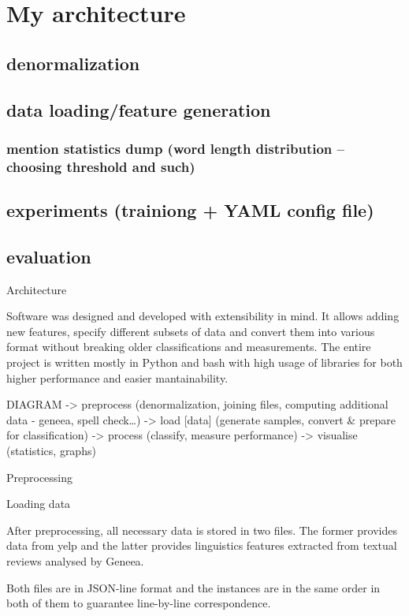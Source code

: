 \chapter{My architecture}

\section{denormalization}

\section{data loading/feature generation}

\subsection{mention statistics dump (word length distribution -- choosing threshold and such)}

\section{experiments (trainiong + YAML config file)}

\section{evaluation}

Architecture

Software was designed and developed with extensibility in mind. It allows adding new features, specify different subsets of data and convert them into various format without breaking older classifications and measurements.
The entire project is written mostly in Python and bash with high usage of libraries for both higher performance and easier mantainability.


DIAGRAM
-> preprocess (denormalization, joining files, computing additional data - geneea, spell check…)
-> load [data] (generate samples, convert \& prepare for classification)
-> process (classify, measure performance)
-> visualise (statistics, graphs)

Preprocessing

Loading data

After preprocessing, all necessary data is stored in two files. The former provides data from yelp and the latter provides linguistics features extracted from textual reviews analysed by Geneea.

Both files are in JSON-line format and the instances are in the same order in both of them to guarantee line-by-line correspondence.

